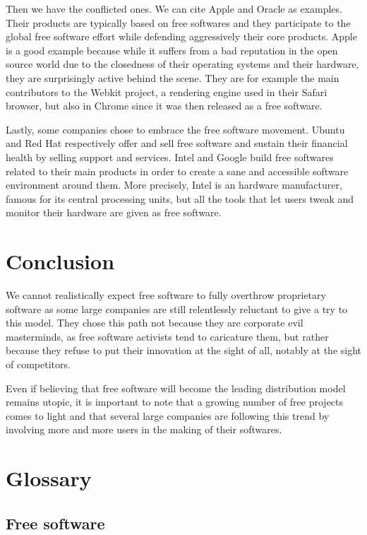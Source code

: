 \documentclass[12pt]{article}
\begin{document}
Then we have the conflicted ones. We can cite Apple and Oracle as
examples. Their products are typically based on free softwares and
they participate to the global free software effort while defending
aggressively their core products. Apple is a good example because
while it suffers from a bad reputation in the open source world due to
the closedness of their operating systems and their hardware, they are
surprisingly active behind the scene. They are for example the main
contributors to the Webkit project, a rendering engine used in their
Safari browser, but also in Chrome since it was then released as a
free software.

Lastly, some companies chose to embrace the free software
movement. Ubuntu and Red Hat respectively offer and sell free software
and sustain their financial health by selling support and
services. Intel and Google build free softwares related to their main
products in order to create a sane and accessible software
environment around them. More precisely, Intel is an hardware
manufacturer, famous for its central processing units, but all the
tools that let users tweak and monitor their hardware are given as
free software.

\section{Conclusion}

We cannot realistically expect free software to fully overthrow
proprietary software as some large companies are still relentlessly
reluctant to give a try to this model.  They chose this path not
because they are corporate evil masterminds, as free software
activists tend to caricature them, but rather because they refuse to
put their innovation at the sight of all, notably at the sight of
competitors.

Even if believing that free software will become the leading
distribution model remains utopic, it is important to note that a
growing number of free projects comes to light and that several large
companies are following this trend by involving more and more users in
the making of their softwares.

\section*{Glossary}

\subsection*{Free software}
\end{document}
